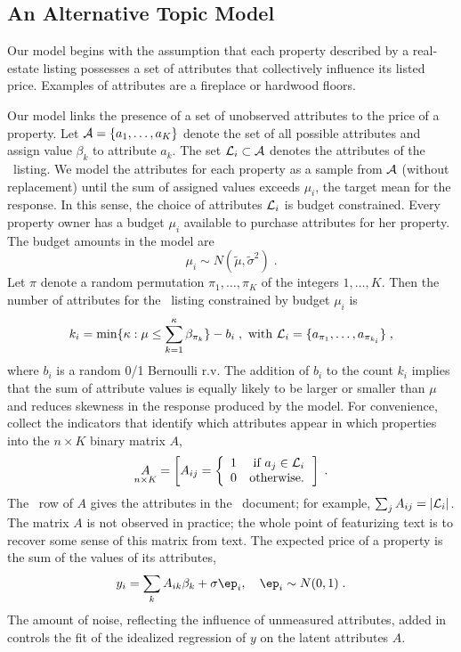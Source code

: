 \documentclass[12pt]{article}
\begin{document}
\subsection{ An Alternative Topic Model } %

Our model begins with the assumption that each property described by a real-estate listing possesses a set of attributes that collectively influence its listed price.   Examples of attributes are a fireplace or hardwood floors. 
 
Our model links the presence of a set of unobserved attributes to the price of a property.  Let ${\cal A} = \{a_1,\ldots, a_K\}$ denote the set of  all possible attributes and assign value $\beta_k$ to attribute $a_k$.  The set ${\cal L}_i \subset {\cal A}$ denotes the attributes of the \ith\ listing.  We model the attributes for each property as a sample from $\cal A$ (without replacement) until the sum of assigned values exceeds $\mu_i$, the target mean for the response.  In this sense, the choice of attributes ${\cal L}_i$ is budget constrained. Every property owner has a budget  $\mu_i$ available to purchase attributes for her property.  The budget amounts in the model are
\begin{equation}
  \mu_i  \sim N(\tilde\mu, \tilde\sigma^2) \;.
\label{eq:mui}
\end{equation}
Let $\pi$ denote a random permutation $\pi_1,\ldots,\pi_K$ of the integers $1, \ldots, K$.  Then the number of attributes for the \ith\ listing constrained by budget $\mu_i$ is 
\begin{equation}
	k_i = \min \{ \kappa:  \mu \le \sum_{k=1}^{\kappa} \beta_{\pi_k} \} - b_i \;,
	\mbox{ with }
	{\cal L}_i = \{a_{\pi_1}, \ldots, a_{\pi_{k_i}} \} \;,
\label{eq:ki}
\end{equation}
where $b_i$ is a random 0/1 Bernoulli r.v.  The addition of $b_i$ to the count $k_i$ implies that the sum of attribute values is equally likely to be larger or smaller than $\mu$ and reduces skewness in the response produced by the model.  For convenience,  collect the indicators that identify which attributes appear in which properties into the $n \times K$ binary matrix $A$,
\begin{equation}
  \underset{n \times K}{A} = \left[ A_{ij} =
              \left\{ \begin{array}{cc} 1 & \mbox{ if } a_j \in {\cal L}_i \cr 0 & \mbox{otherwise.} 
                       \end{array} \right. \right]  \;.
   \label{eq:A}
\end{equation}
The \ith\ row of $A$ gives the attributes in the \ith\ document; for example, $\sum_j A_{ij} = |{\cal L}_i|$. The matrix $A$ is not observed in practice; the whole point of featurizing text is to recover some sense of this matrix from text. The expected price of a property is the sum of the values of its attributes,
\begin{equation}
	y_i = \sum_k A_{ik} \beta_k + \sigma \ep_i, \quad \ep_i \sim N(0,1) \;.
\label{eq:yi}
\end{equation}
The amount of noise, reflecting the influence of unmeasured attributes, added in  controls the fit of the idealized regression of $y$ on the latent attributes $A$.  
\end{document}
